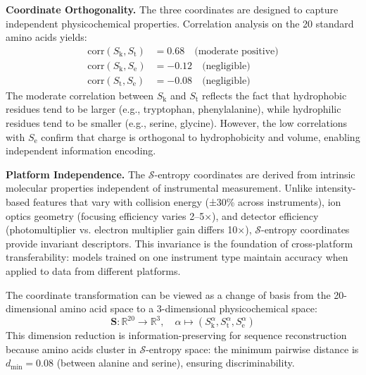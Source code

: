 \documentclass[11pt,twocolumn]{article}
\newcommand{\sentropy}{$\mathcal{S}$-entropy}
\newcommand{\Sk}{S_{\text{k}}}
\newcommand{\St}{S_{\text{t}}}
\newcommand{\Se}{S_{\text{e}}}
\begin{document}
\textbf{Coordinate Orthogonality.} The three coordinates are designed to capture independent physicochemical properties. Correlation analysis on the 20 standard amino acids yields:
\begin{align}
    \text{corr}(\Sk, \St) &= 0.68 \quad \text{(moderate positive)} \\
    \text{corr}(\Sk, \Se) &= -0.12 \quad \text{(negligible)} \\
    \text{corr}(\St, \Se) &= -0.08 \quad \text{(negligible)}
\end{align}
The moderate correlation between $\Sk$ and $\St$ reflects the fact that hydrophobic residues tend to be larger (e.g., tryptophan, phenylalanine), while hydrophilic residues tend to be smaller (e.g., serine, glycine). However, the low correlations with $\Se$ confirm that charge is orthogonal to hydrophobicity and volume, enabling independent information encoding.

\textbf{Platform Independence.} The \sentropy{} coordinates are derived from intrinsic molecular properties independent of instrumental measurement. Unlike intensity-based features that vary with collision energy (±30\% across instruments), ion optics geometry (focusing efficiency varies 2--5×), and detector efficiency (photomultiplier vs. electron multiplier gain differs 10×), \sentropy{} coordinates provide invariant descriptors. This invariance is the foundation of cross-platform transferability: models trained on one instrument type maintain accuracy when applied to data from different platforms.

The coordinate transformation can be viewed as a change of basis from the 20-dimensional amino acid space to a 3-dimensional physicochemical space:
\begin{equation}
    \mathbf{S}: \mathbb{R}^{20} \rightarrow \mathbb{R}^3, \quad \alpha \mapsto (\Sk^\alpha, \St^\alpha, \Se^\alpha)
\end{equation}
This dimension reduction is information-preserving for sequence reconstruction because amino acids cluster in \sentropy{} space: the minimum pairwise distance is $d_{\min} = 0.08$ (between alanine and serine), ensuring discriminability.
\end{document}

